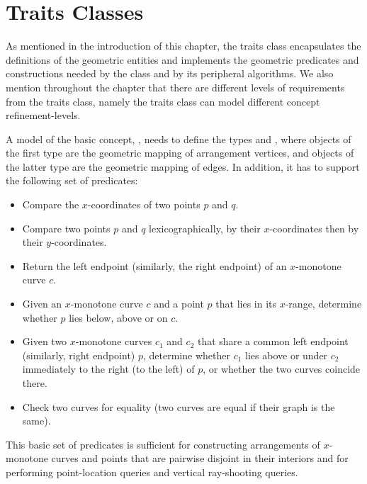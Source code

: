 
\section{Traits Classes}
\label{arr_sec:traits}

As mentioned in the introduction of this chapter, the traits class
encapsulates the definitions of the geometric entities and
implements the geometric predicates and constructions needed by
the  class and by its peripheral algorithms. We also
mention throughout the chapter that there are different levels of
requirements from the traits class, namely the traits class can model
different concept refinement-levels.

A model of the basic concept, ,
needs to define the types  and
, where objects of the first type are
the geometric mapping of arrangement vertices, and objects of the
latter type are the geometric mapping of edges. In addition, it has to
support the following set of predicates:
\begin{itemize}
\item Compare the $x$-coordinates of two points $p$ and $q$.
\item Compare two points $p$ and $q$ lexicographically, by their
$x$-coordinates then by their $y$-coordinates.
\item Return the left endpoint (similarly, the right endpoint) of
an $x$-monotone curve $c$.
\item Given an $x$-monotone curve $c$ and a point $p$ that lies in its
$x$-range, determine whether $p$ lies below, above or on $c$.
\item Given two $x$-monotone curves $c_1$ and $c_2$ that share a
common left endpoint (similarly, right endpoint) $p$, determine
whether $c_1$ lies above or under $c_2$ immediately to the right
(to the left) of $p$, or whether the two curves coincide there.
\item Check two curves for equality (two curves are equal if their
graph is the same).
\end{itemize}
This basic set of predicates is sufficient for constructing
arrangements of $x$-monotone curves and points that are pairwise
disjoint in their interiors and for performing point-location
queries and vertical ray-shooting queries.

